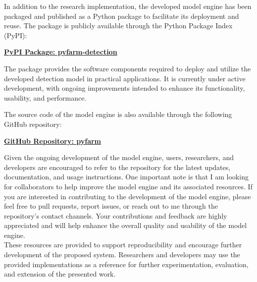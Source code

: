 In addition to the research implementation, the developed model engine has
been packaged and published as a Python package to facilitate its deployment
and reuse. The package is publicly available through the Python Package Index
(PyPI):

\begin{center}
\href{https://pypi.org/project/pyfarm-detection/}
{\textbf{PyPI Package: pyfarm-detection}}
\end{center}

The package provides the software components required to deploy and utilize
the developed detection model in practical applications. It is currently
under active development, with ongoing improvements intended to enhance its
functionality, usability, and performance.

The source code of the model engine is also available through the following
GitHub repository:

\begin{center}
\href{https://github.com/chhaytheanly/pyfarm.git}
{\textbf{GitHub Repository: pyfarm}}
\end{center}

Given the ongoing development of the model engine, users, researchers, and developers are encouraged to refer to the repository for the latest updates, documentation,
and usage instructions. One important note is that I am looking for collaborators to help improve the model engine and its associated resources. 
If you are interested in contributing to the development of the model engine, please feel free to pull requests, report issues, or reach out to me through the repository's contact channels.
Your contributions and feedback are highly appreciated and will help enhance the overall quality and usability of the model engine.\\


These resources are provided to support reproducibility and encourage further
development of the proposed system. Researchers and developers may use the
provided implementations as a reference for further experimentation,
evaluation, and extension of the presented work.
